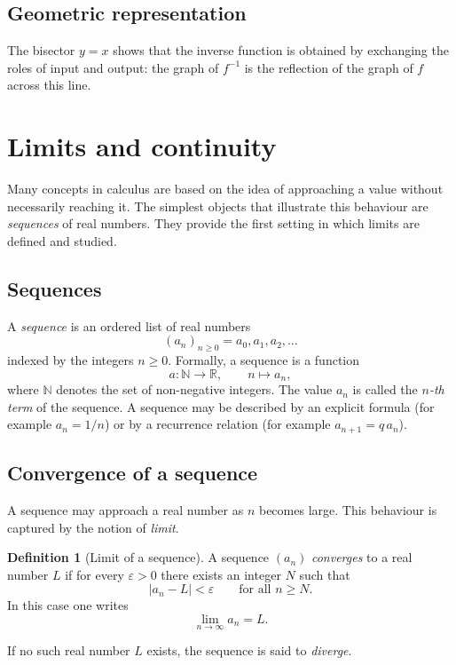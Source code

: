 \documentclass[11pt,a4paper]{article}
\theoremstyle{definition} \newtheorem{definition}{Definition} \theoremstyle{plain} \newtheorem{theorem}{Theorem}
\begin{document}
\subsection{Geometric representation}
\begin{center}  \end{center}
The bisector $y=x$ shows that the inverse function is obtained by exchanging the roles of input and output: the graph of $f^{-1}$ is the reflection of the graph of $f$ across this line.
\clearpage
\section{Limits and continuity}\label{sec:limits}
Many concepts in calculus are based on the idea of approaching a value without necessarily reaching it.
The simplest objects that illustrate this behaviour are \emph{sequences} of real numbers.
They provide the first setting in which limits are defined and studied.
\subsection{Sequences}
A \emph{sequence} is an ordered list of real numbers
\[ (a_n)_{n\ge 0} = a_0, a_1, a_2, \ldots \]
indexed by the integers $n\ge 0$.
Formally, a sequence is a function
\[ a : \mathbb{N} \to \mathbb{R}, \qquad n \mapsto a_n, \]
where $\mathbb{N}$ denotes the set of non-negative integers.
The value $a_n$ is called the \emph{$n$-th term} of the sequence.
A sequence may be described by an explicit formula (for example $a_n = 1/n$) or by a recurrence relation (for example $a_{n+1} = q\,a_n$).
\subsection{Convergence of a sequence}
A sequence may approach a real number as $n$ becomes large.
This behaviour is captured by the notion of \emph{limit}.
\begin{definition}[Limit of a sequence] A sequence $(a_n)$ \emph{converges} to a real number $L$ if for every $\varepsilon > 0$ there exists an integer $N$ such that
\[ |a_n - L| < \varepsilon \qquad \text{for all } n \ge N. \]
In this case one writes
\[ \lim_{n\to\infty} a_n = L. \]
\end{definition}
If no such real number $L$ exists, the sequence is said to \emph{diverge}.
\end{document}
